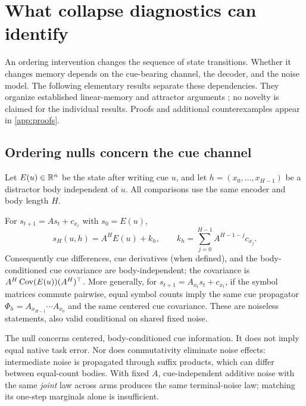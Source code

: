 \section{What collapse diagnostics can identify}
\label{sec:theory}

An ordering intervention changes the sequence of state transitions. Whether it
changes memory depends on the cue-bearing channel, the decoder, and the noise
model. The following elementary results separate these dependencies. They
organize established linear-memory and attractor arguments
\citep{ganguli2008-memory-traces,seung1996,pals2024-phase-locked-memory}; no
novelty is claimed for the individual results. Proofs and additional
counterexamples appear in \cref{app:proofs}.

\subsection{Ordering nulls concern the cue channel}

Let $E(u)\in\mathbb{R}^n$ be the state after writing cue $u$, and let
$h=(x_0,\ldots,x_{H-1})$ be a distractor body independent of $u$.
All comparisons use the same encoder and body length $H$.

\begin{proposition}
\label{prop:affine}\label{prop:commuting}
For $s_{t+1}=As_t+c_{x_t}$ with $s_0=E(u)$,
\begin{equation}
 s_H(u,h)=A^H E(u)+k_h,\qquad
 k_h=\sum_{j=0}^{H-1}A^{H-1-j}c_{x_j}.
 \label{eq:affine-channel}
\end{equation}
Consequently cue differences, cue derivatives (when defined), and the
body-conditioned cue covariance are body-independent; the covariance is
$A^H\operatorname{Cov}(E(u))(A^H)^\top$.
More generally, for $s_{t+1}=A_{x_t}s_t+c_{x_t}$, if the symbol matrices
commute pairwise, equal symbol counts imply the same cue propagator
$\Phi_h=A_{x_{H-1}}\cdots A_{x_0}$ and the same centered cue covariance.
These are noiseless statements, also valid conditional on shared fixed noise.
\end{proposition}

The null concerns centered, body-conditioned cue information. It does not imply
equal native task error. Nor does commutativity eliminate noise effects:
intermediate noise is propagated through suffix products, which can differ
between equal-count bodies. With fixed $A$, cue-independent additive noise
with the same \emph{joint} law across arms produces the same terminal-noise law;
matching its one-step marginals alone is insufficient.


